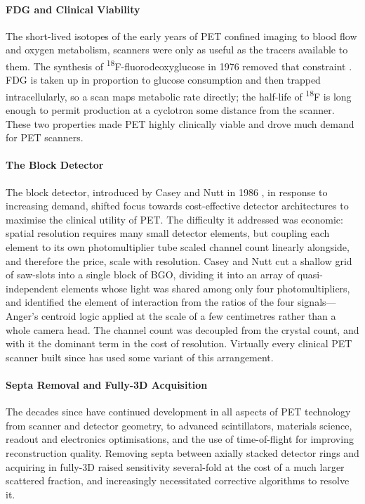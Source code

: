 \paragraph{FDG and Clinical Viability}
The short-lived isotopes of the early years of PET confined imaging to blood flow and oxygen metabolism, scanners were only as useful as the tracers available to them.
The synthesis of \textsuperscript{18}F-fluorodeoxyglucose in 1976 removed that constraint \cite{Ido1978}.
FDG is taken up in proportion to glucose consumption and then trapped intracellularly, so a scan maps metabolic rate directly; the  half-life of \textsuperscript{18}F is long enough to permit production at a cyclotron some distance from the scanner.
These two properties made PET highly clinically viable and drove much demand for PET scanners.

\paragraph{The Block Detector}
The block detector, introduced by Casey and Nutt in 1986 \cite{Casey1986}, in response to increasing demand, shifted focus towards cost-effective detector architectures to maximise the clinical utility of PET.
The difficulty it addressed was economic: spatial resolution requires many small detector elements, but coupling each element to its own photomultiplier tube scaled channel count linearly alongside, and therefore the price, scale with resolution.
Casey and Nutt cut a shallow grid of saw-slots into a single block of BGO, dividing it into an array of quasi-independent elements whose light was shared among only four photomultipliers, and identified the element of interaction from the ratios of the four signals---Anger's centroid logic applied at the scale of a few centimetres rather than a whole camera head.
The channel count was decoupled from the crystal count, and with it the dominant term in the cost of resolution.
Virtually every clinical PET scanner built since has used some variant of this arrangement.

\paragraph{Septa Removal and Fully-3D Acquisition}
The decades since have continued development in all aspects of PET technology from scanner and detector geometry, to advanced scintillators, materials science, readout and electronics optimisations, and the use of time-of-flight for improving reconstruction quality.
Removing septa between axially stacked detector rings and acquiring in fully-3D raised sensitivity several-fold at the cost of a much larger scattered fraction, and increasingly necessitated corrective algorithms to resolve it.


